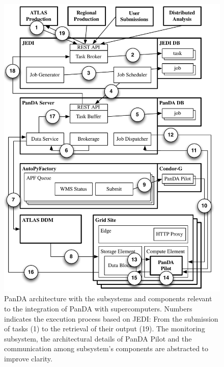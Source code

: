 \begin{figure}
    \centering
    \includegraphics[width=\columnwidth]{figures/panda_architecture.pdf}
    \caption{PanDA architecture with the subsystems and components relevant to
    the integration of PanDA with supercomputers. Numbers indicates the
    execution process based on JEDI: From the submission of tasks (1) to the
    retrieval of their output (19). The monitoring subsystem, the architectural
    details of PanDA Pilot and the communication among subsystem's components
    are abstracted to improve clarity.}
\label{fig:architecture}
\end{figure}


